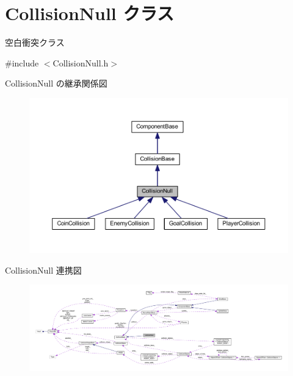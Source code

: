 \hypertarget{class_collision_null}{}\section{Collision\+Null クラス}
\label{class_collision_null}


空白衝突クラス  




{\ttfamily \#include $<$Collision\+Null.\+h$>$}



Collision\+Null の継承関係図\nopagebreak
\begin{figure}[H]
\begin{center}
\leavevmode
\includegraphics[width=350pt]{class_collision_null__inherit__graph}
\end{center}
\end{figure}


Collision\+Null 連携図\nopagebreak
\begin{figure}[H]
\begin{center}
\leavevmode
\includegraphics[width=350pt]{class_collision_null__coll__graph}
\end{center}
\end{figure}
